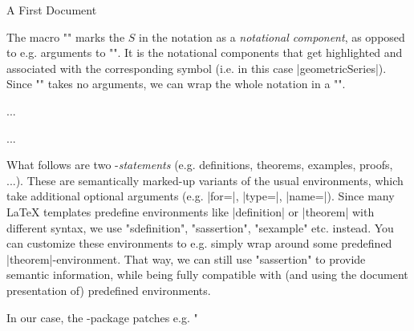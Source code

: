 \begin{sfragment}{A First \sTeX Document}
    \begin{function}{\comp}
      The macro \stexcode"\comp" marks the $S$ in the notation as a
      \emph{notational component}, as opposed to e.g. arguments
      to \stexcode"\geometricSeries".
      It is the notational components that get highlighted
      and associated with the corresponding symbol (i.e. in this
      case |geometricSeries|). Since \stexcode"\geometricSeries" takes
      no arguments, we can wrap the whole notation in a \stexcode"\comp".
    \end{function}\bigskip

    \begin{latexcode}[numbers=none,aboveskip=0pt,belowskip=0pt,gobble=8]
        \begin{sdefinition}[for=geometricSeries]
        ...
        \end{sdefinition}
        \begin{sassertion}[name=geometricSeriesConverges,type=theorem]
        ...
        \end{sassertion}
    \end{latexcode}
    What follows are two \sTeX-\emph{statements} (e.g. definitions,
    theorems, examples, proofs, ...). These are semantically marked-up
    variants of the usual environments, which take additional optional
    arguments (e.g. |for=|, |type=|, |name=|). Since many \LaTeX\xspace templates
    predefine environments like |definition| or |theorem| with
    different syntax, we use \stexcode"sdefinition", 
    \stexcode"sassertion", \stexcode"sexample"
    etc. instead. You can customize these environments to e.g.
    simply wrap around some predefined |theorem|-environment.
    That way, we can still use \stexcode"sassertion" to provide semantic
    information, while being fully compatible with (and using
    the document presentation of) predefined environments.

    In our case, the -package patches
    e.g. \stexcode"\fi


\end{sfragment}
